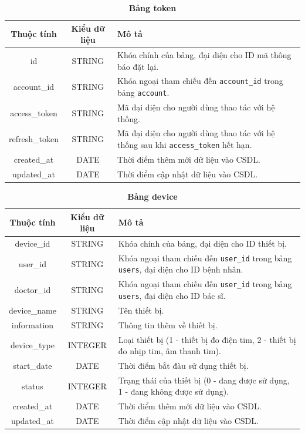\begin{table}[H]
  \caption{\bfseries \fontsize{12pt}{0pt}\selectfont Bảng token}
  \centering
  \begin{tabularx}{0.9\textwidth}{|c|c|X|}
    \hline
    \textbf{Thuộc tính} & \textbf{Kiểu dữ liệu} & \textbf{Mô tả} \\
    \hline
    id & STRING & Khóa chính của bảng, đại diện cho ID mã thông báo đặt lại. \\
    \hline
    account\_id & STRING & Khóa ngoại tham chiếu đến \texttt{account\_id} trong bảng \texttt{account}. \\
    \hline
    access\_token & STRING & Mã đại diện cho người dùng thao tác với hệ thống. \\
    \hline
    refresh\_token & STRING & Mã đại diện cho người dùng thao tác với hệ thống sau khi \texttt{access\_token} hết hạn. \\
    \hline
    created\_at & DATE & Thời điểm thêm mới dữ liệu vào CSDL. \\
    \hline
    updated\_at & DATE & Thời điểm cập nhật dữ liệu vào CSDL. \\
    \hline
  \end{tabularx}
\end{table}




\begin{table}[H]
  \caption{\bfseries \fontsize{12pt}{0pt}\selectfont Bảng device}
  \centering
  \begin{tabularx}{0.9\textwidth}{|c|c|X|}
    \hline
    \textbf{Thuộc tính} & \textbf{Kiểu dữ liệu} & \textbf{Mô tả} \\
    \hline
    device\_id & STRING & Khóa chính của bảng, đại diện cho ID thiết bị. \\
    \hline
    user\_id & STRING & Khóa ngoại tham chiếu đến \texttt{user\_id} trong bảng \texttt{users}, đại diện cho ID bệnh nhân. \\
    \hline
    doctor\_id & STRING & Khóa ngoại tham chiếu đến \texttt{user\_id} trong bảng \texttt{users}, đại diện cho ID bác sĩ. \\
    \hline
    device\_name & STRING & Tên thiết bị. \\
    \hline
    information & STRING & Thông tin thêm về thiết bị. \\
    \hline
    device\_type & INTEGER & Loại thiết bị (1 - thiết bị đo điện tim, 2 - thiết bị đo nhịp tim, âm thanh tim). \\
    \hline
    start\_date & DATE & Thời điểm bắt đàu sử dụng thiết bị. \\
    \hline
    status & INTEGER & Trạng thái của thiết bị (0 - đang được sử dụng, 1 - đang không được sử dụng). \\
    \hline
    created\_at & DATE & Thời điểm thêm mới dữ liệu vào CSDL. \\
    \hline
    updated\_at & DATE & Thời điểm cập nhật dữ liệu vào CSDL. \\
    \hline
  \end{tabularx}
\end{table}


